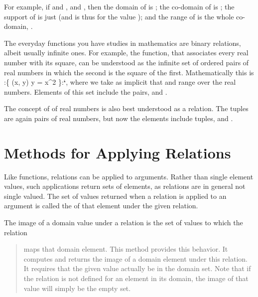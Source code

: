 \documentclass[letterpaper,10pt,english]{sphinxmanual}
\begin{document}
For example, if  and , and , then the domain of  is ; the
co-domain of  is ; the support of  is just  (and 
is thus  for the value ); and the range of  is
the whole co-domain, .

The everyday functions you have studies in mathematics are binary
relations, albeit usually infinite ones. For example, the 
function, that associates every real number with its square, can be
understood as the infinite set of ordered pairs of real numbers in
which the second is the square of the first. Mathematically this is
:\{ (x, y) \textbar{} y = x\textasciicircum{}2 \}:{\color{red}\bfseries{}{}`}, where we take as implicit that  and 
range over the real numbers. Elements of this set include the pairs,
 and .

The concept of  of real numbers is also best understood
as a relation. The tuples are again pairs of real numbers, but now the
elements include tuples,  and .


\section{Methods for Applying Relations}
\label{\detokenize{08-relations:methods-for-applying-relations}}
Like functions, relations can be applied to arguments. Rather than
single element values, such applications return sets of elements,
as relations are in general not single valued. The set of values
returned when a relation is applied to an argument is called the
 of that element under the given relation.

The image of a domain value under a relation
is the set of values to which the relation
\begin{quote}

maps that domain element. This method provides
this behavior. It computes and returns the
image of a domain element under this relation.
It requires that the given value actually be
in the domain set. Note that if the relation
is not defined for an element in its domain,
the image of that value will simply be the
empty set.
\end{quote}
\end{document}

